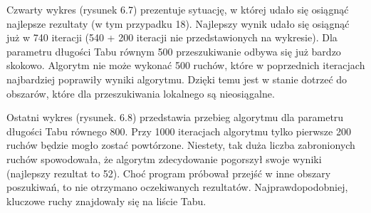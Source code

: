 Czwarty wykres (rysunek 6.7) prezentuje sytuację, w której udało się osiągnąć najlepsze rezultaty (w tym przypadku 18). Najlepszy wynik udało się osiągnąć już w 740 iteracji (540 + 200 iteracji nie przedstawionych na wykresie). Dla parametru długości Tabu równym 500 przeszukiwanie odbywa się już bardzo skokowo. Algorytm nie może wykonać 500 ruchów, które w poprzednich iteracjach najbardziej poprawiły wyniki algorytmu. Dzięki temu jest w stanie dotrzeć do obszarów, które dla przeszukiwania lokalnego są nieosiągalne.

Ostatni wykres (rysunek. 6.8) przedstawia przebieg algorytmu dla parametru długości Tabu równego 800. Przy 1000 iteracjach algorytmu tylko pierwsze 200 ruchów będzie mogło zostać powtórzone. Niestety, tak duża liczba zabronionych ruchów spowodowała, że algorytm zdecydowanie pogorszył swoje wyniki (najlepszy rezultat to 52). Choć program próbował przejść w inne obszary poszukiwań, to nie otrzymano oczekiwanych rezultatów. Najprawdopodobniej, kluczowe ruchy znajdowały się na liście Tabu.